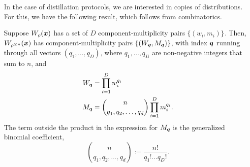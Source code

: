 \documentclass[pra,
aps,
twocolumn,
superscriptaddress,
groupedaddress,
nofootinbib,
reprint
]{revtex4-1}
\begin{document}
In the case of distillation protocols, we are interested in copies of distributions. 
For this, we have the following result, which follows from combinatorics.
\begin{lemma}\label{lem:ncopycomponents}
	Suppose $W_\rho(\boldsymbol{x})$ has a set of $D$ component-multiplicity pairs $\{(w_i, m_i)\}$. Then, $W_{\rho^{\otimes n}} (\boldsymbol{x})$ has component-multiplicity pairs $\{(W_{\boldsymbol{q}}, M_{\boldsymbol{q}})\}$, with index $\boldsymbol{q}$ running through all vectors $(q_1, \dots, q_D)$, where $q_1, \dots, q_D$ are non-negative integers that sum to $n$, and
\begin{align}
	W_{\boldsymbol{q}} &= \prod_{i=1}^D w_i^{q_i} \label{eq:W}\\
	M_{\boldsymbol{q}} &= \binom{n}{q_1,q_2, \dots, q_d} \prod_{i=1}^D m_i^{q_i}. \label{eq:M}
\end{align}
The term outside the product in the expression for $M_{\boldsymbol{q}}$ is the generalized binomial coefficient,
\begin{equation}
	\binom{n}{q_1,q_2, \dots, q_d} := \frac{n!}{q_1!\dots q_D!}.
\end{equation}
\end{lemma}
\end{document}
